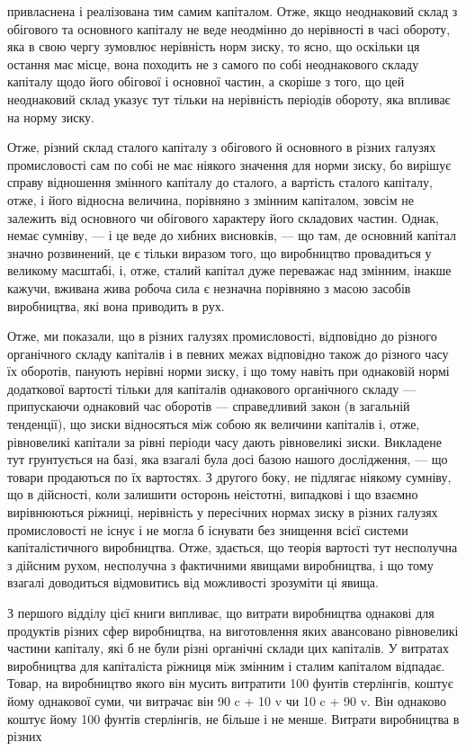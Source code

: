 \parcont{}  %
привласнена і реалізована тим самим капіталом. Отже, якщо неоднаковий склад з обігового та основного
капіталу не веде неодмінно до нерівності в часі обороту, яка в свою чергу зумовлює нерівність норм
зиску, то ясно, що оскільки ця остання
має місце, вона походить не з самого по собі неоднакового
складу капіталу щодо його обігової і основної частин, а скоріше
з того, що цей неоднаковий склад указує тут тільки на нерівність періодів обороту, яка впливає на
норму зиску.

Отже, різний склад сталого капіталу з обігового й основного
в різних галузях промисловості сам по собі не має ніякого значення для норми зиску, бо вирішує
справу відношення змінного капіталу до сталого, а вартість сталого капіталу, отже, і його
відносна величина, порівняно з змінним капіталом, зовсім не залежить від основного чи обігового
характеру його складових
частин. Однак, немає сумніву, — і це веде до хибних висновків, — що там, де основний капітал значно
розвинений, це є
тільки виразом того, що виробництво провадиться у великому
масштабі, і, отже, сталий капітал дуже переважає над змінним,
інакше кажучи, вживана жива робоча сила є незначна порівняно з масою засобів виробництва, які вона
приводить в рух.

Отже, ми показали, що в різних галузях промисловості, відповідно до різного органічного складу
капіталів і в певних
межах відповідно також до різного часу їх оборотів, панують
нерівні норми зиску, і що тому навіть при однаковій нормі додаткової вартості тільки для капіталів
однакового органічного
складу — припускаючи однаковий час оборотів — справедливий
закон (в загальній тенденції), що зиски відносяться між собою
як величини капіталів і, отже, рівновеликі капітали за рівні
періоди часу дають рівновеликі зиски. Викладене тут грунтується
на базі, яка взагалі була досі базою нашого дослідження, — що товари продаються по їх вартостях. З
другого боку, не підлягає ніякому сумніву, що в дійсності, коли залишити осторонь
неістотні, випадкові і що взаємно вирівнюються ріжниці, нерівність у пересічних нормах зиску в
різних галузях промисловості не існує і не могла б існувати без знищення всієї системи
капіталістичного виробництва. Отже, здається, що теорія вартості тут несполучна з дійсним рухом,
несполучна
з фактичними явищами виробництва, і що тому взагалі доводиться відмовитись від можливості зрозуміти
ці явища.

З першого відділу цієї книги випливає, що витрати виробництва однакові для продуктів різних сфер
виробництва, на виготовлення яких авансовано рівновеликі частини капіталу, які б
не були різні органічні склади цих капіталів. У витратах виробництва для капіталіста ріжниця між
змінним і сталим капіталом
відпадає. Товар, на виробництво якого він мусить витратити
100 фунтів стерлінгів, коштує йому однакової суми, чи витрачає
він 90 c + 10 v чи 10 c + 90 v. Він однаково коштує йому 100 фунтів
стерлінгів, не більше і не менше. Витрати виробництва в різних
\parbreak{}  %
